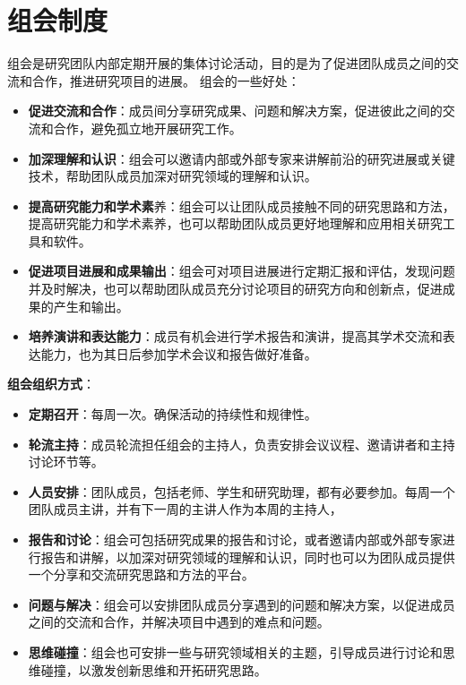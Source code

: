 \documentclass[
]{ctexbook}
\providecommand{\tightlist}{%
  \setlength{\itemsep}{0pt}\setlength{\parskip}{0pt}}
\begin{document}
\hypertarget{ux7ec4ux4f1aux5236ux5ea6}{%
\section{组会制度}\label{ux7ec4ux4f1aux5236ux5ea6}}

组会是研究团队内部定期开展的集体讨论活动，目的是为了促进团队成员之间的交流和合作，推进研究项目的进展。
组会的一些好处：

\begin{itemize}
\tightlist
\item
  \textbf{促进交流和合作}：成员间分享研究成果、问题和解决方案，促进彼此之间的交流和合作，避免孤立地开展研究工作。
\item
  \textbf{加深理解和认识}：组会可以邀请内部或外部专家来讲解前沿的研究进展或关键技术，帮助团队成员加深对研究领域的理解和认识。
\item
  \textbf{提高研究能力和学术素}养：组会可以让团队成员接触不同的研究思路和方法，提高研究能力和学术素养，也可以帮助团队成员更好地理解和应用相关研究工具和软件。
\item
  \textbf{促进项目进展和成果输出}：组会可对项目进展进行定期汇报和评估，发现问题并及时解决，也可以帮助团队成员充分讨论项目的研究方向和创新点，促进成果的产生和输出。
\item
  \textbf{培养演讲和表达能力}：成员有机会进行学术报告和演讲，提高其学术交流和表达能力，也为其日后参加学术会议和报告做好准备。
\end{itemize}

\textbf{组会组织方式}：

\begin{itemize}
\tightlist
\item
  \textbf{定期召开}：每周一次。确保活动的持续性和规律性。
\item
  \textbf{轮流主持}：成员轮流担任组会的主持人，负责安排会议议程、邀请讲者和主持讨论环节等。
\item
  \textbf{人员安排}：团队成员，包括老师、学生和研究助理，都有必要参加。每周一个团队成员主讲，并有下一周的主讲人作为本周的主持人，
\item
  \textbf{报告和讨论}：组会可包括研究成果的报告和讨论，或者邀请内部或外部专家进行报告和讲解，以加深对研究领域的理解和认识，同时也可以为团队成员提供一个分享和交流研究思路和方法的平台。
\item
  \textbf{问题与解决}：组会可以安排团队成员分享遇到的问题和解决方案，以促进成员之间的交流和合作，并解决项目中遇到的难点和问题。
\item
  \textbf{思维碰撞}：组会也可安排一些与研究领域相关的主题，引导成员进行讨论和思维碰撞，以激发创新思维和开拓研究思路。
\end{itemize}
\end{document}

